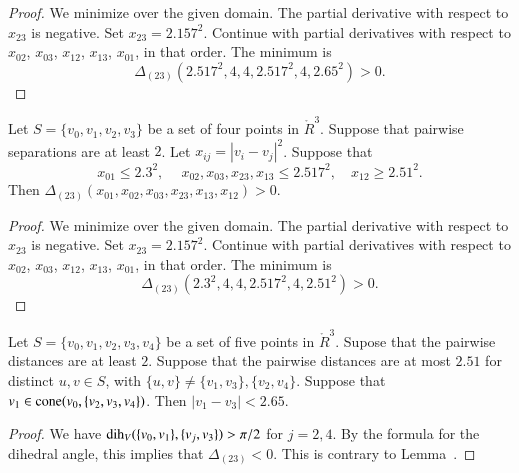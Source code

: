 \begin{proof} We minimize over the given domain.
The partial derivative with respect to $x_{23}$ is negative.
Set $x_{23}=2.157^2$.  Continue with partial derivatives with
respect to $x_{02}$, $x_{03}$, $x_{12}$, $x_{13}$, $x_{01}$, in that order.
The minimum is
$$\Delta_{(23)}(2.517^2,4,4,2.517^2,4,2.65^2) >0.$$ 
\end{proof}

\newpage

\begin{lemma}
Let $S=\{v_0,v_1,v_2,v_3\}$ be a set of four
points in $\ring{R}^3$.  Suppose that pairwise separations
are at least $2$. 
Let $x_{ij}=|v_i-v_j|^2$.
 Suppose that
$$
x_{01}\le 2.3^2,\
\quad x_{02},x_{03},x_{23},x_{13}\le 2.517^2,\quad x_{12}\ge 2.51^2.
$$
Then $\Delta_{(23)}(x_{01},x_{02},x_{03},x_{23},x_{13},x_{12})>0$.
\end{lemma}

\begin{proof} We minimize over the given domain.
The partial derivative with respect to $x_{23}$ is negative.
Set $x_{23}=2.157^2$.  Continue with partial derivatives with
respect to $x_{02}$, $x_{03}$, $x_{12}$, $x_{13}$, $x_{01}$, in that order.
The minimum is
$$\Delta_{(23)}(2.3^2,4,4,2.517^2,4,2.51^2) >0.$$ 
\end{proof}

\newpage

\begin{lemma}
Let $S=\{v_0,v_1,v_2,v_3,v_4\}$ be a set of
five points in $\ring{R}^3$.  Supose that the pairwise
distances are at least $2$.  Suppose that the pairwise
distances are at most $2.51$ for distinct $u,v\in S$, with
$\{u,v\}\ne \{v_1,v_3\}, \{v_2,v_4\}$.
Suppose that $v_1\in{\operatorname{cone}}(v_0,\{v_2,v_3,v_4\})$.
Then $|v_1-v_3|< 2.65$.  
\end{lemma}

\begin{proof}
We have $\operatorname{dih}_V(\{v_0,v_1\},\{v_j,v_3\})>\pi/2$ for $j=2,4$.
  By the formula for the dihedral angle, this
implies that $\Delta_{(23)}<0$.  This is contrary to Lemma~.
\end{proof}
\newpage


\newpage

